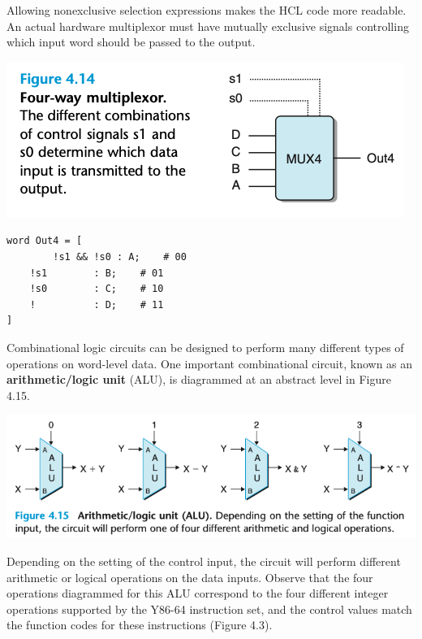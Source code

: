 \documentclass[11pt]{article}
\begin{document}
Allowing nonexclusive selection expressions makes the HCL code more readable. An actual hardware multiplexor must have mutually exclusive signals controlling which input word should be passed to the output.\\

\begin{center}
\includegraphics[width=.9\linewidth]{pics/figure4.14-four-way-multiplexor.png}
\end{center}

\begin{verbatim}
word Out4 = [
        !s1 && !s0 : A;    # 00
	!s1        : B;    # 01
	!s0        : C;    # 10
	!          : D;    # 11
]
\end{verbatim}

Combinational logic circuits can be designed to perform many different types of operations on word-level data.  One important combinational circuit, known as an \textbf{arithmetic/logic unit} (ALU), is diagrammed at an abstract level in Figure 4.15.\\

\begin{center}
\includegraphics[width=.9\linewidth]{pics/figure4.15-arithmetic-logic-unit.png}
\end{center}

Depending on the setting of the control input, the circuit will perform different arithmetic or logical operations on the data inputs. Observe that the four operations diagrammed for this ALU correspond to the four different integer operations supported by the Y86-64 instruction set, and the control values match the function codes for these instructions (Figure 4.3).\\
\end{document}
